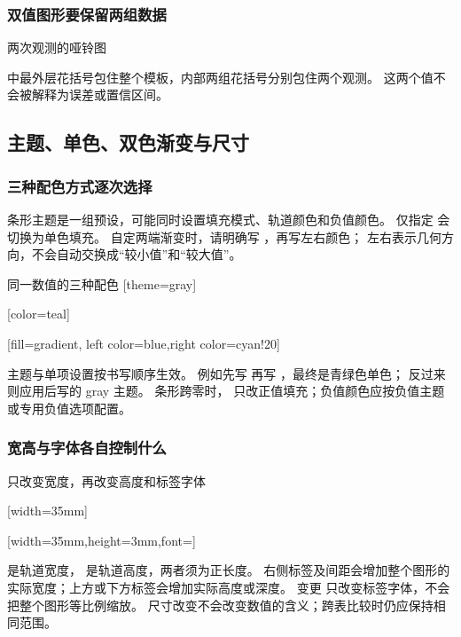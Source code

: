 \subsubsection{双值图形要保留两组数据}
\begin{example}[text and listing,sidebyside=false]{两次观测的哑铃图}
\begingroup
\gradbarsnewcommand[
  type=dumbbell,args={m m},data={{#1}{#2}},
  min=0,max=1,width=30mm,precision=3
]{\pairbar}
\endgroup
\end{example}
 中最外层花括号包住整个模板，内部两组花括号分别包住两个观测。
这两个值不会被解释为误差或置信区间。

\subsection{主题、单色、双色渐变与尺寸}
\label{sec:command-colors-cn}
\subsubsection{三种配色方式逐次选择}
条形主题是一组预设，可能同时设置填充模式、轨道颜色和负值颜色。
仅指定  会切换为单色填充。
自定两端渐变时，请明确写 ，再写左右颜色；
左右表示几何方向，不会自动交换成“较小值”和“较大值”。
\begin{example}[text and listing,sidebyside=false]{同一数值的三种配色}
\begingroup
{}
[theme=gray]\par\medskip
{}[color=teal]\par\medskip
{}[fill=gradient,
  left color=blue,right color=cyan!20]
\endgroup
\end{example}
主题与单项设置按书写顺序生效。
例如先写  再写 ，最终是青绿色单色；
反过来则应用后写的 gray 主题。
条形跨零时， 只改正值填充；负值颜色应按负值主题或专用负值选项配置。

\subsubsection{宽高与字体各自控制什么}
\begin{example}[text and listing,sidebyside=false]{只改变宽度，再改变高度和标签字体}
\begingroup
\gradbarsnewcommand[
  args={m O{}},data={#1},options={#2},
  theme=gray,max=1,width=20mm,height=5pt,precision=3,
  label position=right,label distance=1mm
]{\sizebar}
\par\medskip
{}[width=35mm]\par\medskip
{}[width=35mm,height=3mm,font={\small\bfseries}]
\endgroup
\end{example}
 是轨道宽度， 是轨道高度，两者须为正长度。
右侧标签及间距会增加整个图形的实际宽度；上方或下方标签会增加实际高度或深度。
变更  只改变标签字体，不会把整个图形等比例缩放。
尺寸改变不会改变数值的含义；跨表比较时仍应保持相同范围。

